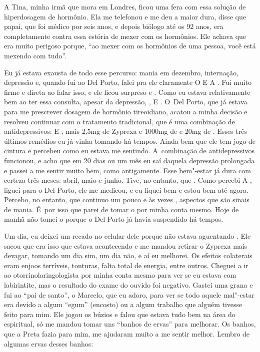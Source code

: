 A Tina, minha irmã que mora em Londres, ficou uma fera com essa solução
de hiperdosagem de hormônio. Ela me telefonou e me deu a maior dura,
disse que papai, que foi médico por seis anos, e depois biólogo até os
92 anos, era completamente contra essa estória de mexer com os
hormônios. Ele achava que era muito perigoso porque, ``ao mexer com os
hormônios de uma pessoa, você está mexendo com tudo''.

Eu já estava exausta de todo esse percurso: mania em dezembro,
internação, depressão e, quando fui ao Del Porto, falei pra ele
claramente         O   E 
A  . Fui muito firme e direta ao falar isso, e ele ficou
surpreso e . Como eu estava relativamente bem ao ter essa
consulta, apesar da depressão,     ,  E
. O~Del Porto, que já estava para me prescrever dosagem de
hormônio tireoidiano, acatou a minha decisão e resolveu continuar com o
tratamento tradicional, que é uma combinação de antidepressivos: 
E , mais 2,5mg de Zyprexa e 1000mg de  e 20mg de
. Esses três últimos remédios eu já vinha tomando há tempos.
Ainda bem que ele tem jogo de cintura e percebeu como eu estava me
sentindo. A~combinação de antidepressivos funcionou, e acho que em 20
dias ou um mês eu saí daquela depressão prolongada e passei a me sentir
muito bem, como antigamente. Esse bem"-estar já dura com certeza três
meses: abril, maio e junho. Tive, no entanto, que   
    . Como percebi A , liguei para o Del
Porto, ele me medicou, e eu fiquei bem e estou bem até agora. Percebo,
no entanto, que continuo um pouco  e às vezes ,
aspectos que são sinais de mania. É~por isso que parei de tomar o
 por minha conta mesmo. Hoje de manhã não tomei o 
porque o Del Porto já havia suspendido há tempos.

Um dia, eu deixei um recado  no celular dele porque não
estava aguentando       . Ele
sacou que era isso que estava acontecendo e me mandou retirar o Zyprexa
mais devagar, tomando um dia sim, um dia não, e aí eu melhorei. Os
efeitos colaterais eram enjoos terríveis, tonturas, falta total de
energia, entre outros. Cheguei a ir ao otorrinolaringologista por minha
conta mesmo para ver se eu estava com labirintite, mas o resultado do
exame do ouvido foi negativo. Gastei uma grana e fui ao ``pai de
santo'', o Marcelo, que eu adoro, para ver se todo aquele mal"-estar era
devido a algum ``egum'' (encosto) ou a algum trabalho que alguém tivesse
feito para mim. Ele jogou os búzios e falou que estava tudo bem na área
do espiritual, só me mandou tomar uns ``banhos de ervas'' para melhorar.
Os banhos, que a Preta fazia para mim, me ajudaram muito a me sentir
melhor. Lembro de algumas ervas desses banhos:

